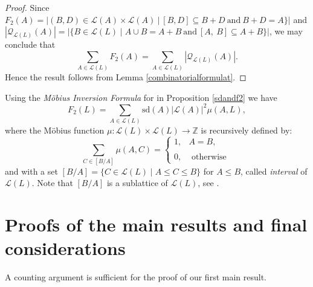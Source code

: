 \documentclass{amsart}
\theoremstyle{definition}
\numberwithin{equation}{section}
\begin{document}
\begin{proof}
Since $F_2(A)=|{(B,D) \in \mathcal{L}(A)\times \mathcal{L}(A)}\  | \ [B,D] \subseteq B+D \ \mbox{and} \  B+D=A\}|$  and  $ |\mathcal{Q}_{\mathcal{L}(L)}(A)|=|\{B \in \mathcal{L}(L)  \mid A\cup B =A+B\ \mbox{and} \ [A, \  B] \subseteq A+B \}|$, we may conclude that
$$\underset{A\in \mathcal{L}(L)}{\sum} F_2(A)= \underset{A\in \mathcal{L}(L)}{\sum} |\mathcal{Q}_{\mathcal{L}(L)}(A)|.$$ Hence the result follows from Lemma \ref{combinatorialformulat}.
\end{proof}

Using the \textit{Möbius Inversion Formula}  for in Proposition \ref{sdandf2} we have 
\begin{equation} \label{sdandf2viamobius}
    F_2(L)= \underset{A\in \mathcal{L}(L)}{\sum} \mathrm{sd}(A) |\mathcal{L}(A)|^2 \mu(A,L),
\end{equation}
where the Möbius function  $\mu: \mathcal{L}(L) \times\mathcal{L}(L) \rightarrow \mathbb{Z}$ is recursively defined by: 
\begin{equation} \label{mobius}
    \sum_{C \in[B / A]} \mu(A, C)= \begin{cases}1, & A=B, \\ 
   \\ 
   0, & \text { otherwise } \end{cases}
\end{equation}
and   with a set
$[B / A]=\{C \in \mathcal{L}(L) \mid A \leq C \leq B\}$
for $A \leq B$,  called  \textit{interval} of $\mathcal{L}(L)$. Note that $[B / A]$ is a sublattice of $\mathcal{L}(L)$, see \cite{sr1, sr2, or, rs}. 







\section{Proofs of the main results and final considerations}\label{sec4}

A  counting argument is sufficient for the proof of our first main result.
\end{document}
